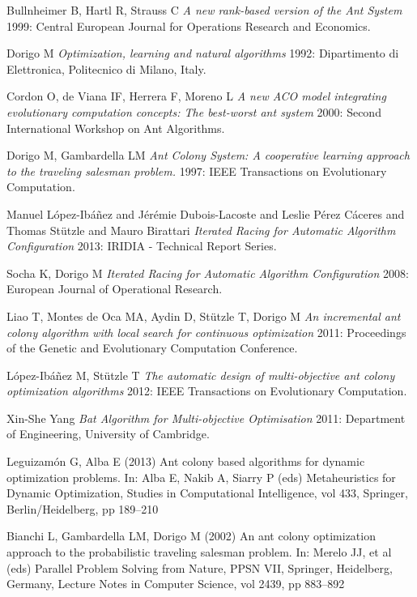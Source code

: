 \documentclass[12pt]{article}
\begin{document}
\begin{thebibliography}{1}
 Bullnheimer B, Hartl R, Strauss C {\em A new rank-based version of the
Ant System} 1999: Central European Journal for Operations Research and Economics.

 Dorigo M {\em Optimization, learning and natural algorithms} 1992: Dipartimento di Elettronica, Politecnico di Milano, Italy.

 Cordon O, de Viana IF, Herrera F, Moreno L {\em A new ACO model
integrating evolutionary computation concepts: The best-worst ant system} 2000: Second International Workshop on Ant Algorithms.

 Dorigo M, Gambardella LM {\em Ant Colony System: A cooperative learning approach to the traveling salesman problem.} 1997: IEEE Transactions on Evolutionary
Computation.

 Manuel L{\'o}pez-Ib{\'a}{\~n}ez  and  J{\'e}r{\'e}mie Dubois-Lacoste  and Leslie {P{\'e}rez C{\'a}ceres}  and  Thomas St{\"u}tzle  and  Mauro Birattari {\em Iterated Racing for Automatic Algorithm Configuration} 2013: IRIDIA - Technical Report Series.

 Socha K, Dorigo M {\em Iterated Racing for Automatic Algorithm Configuration} 2008: European Journal of Operational Research.
  
 Liao T, Montes de Oca MA, Aydin D, St{\"u}tzle T, Dorigo M {\em An incremental ant colony algorithm with local search for continuous optimization} 2011: Proceedings of the Genetic and Evolutionary
Computation Conference.  
  
 L{\'o}pez-Ib{\'a}{\~n}ez M, St{\"u}tzle T {\em The automatic design of multi-objective ant colony optimization algorithms} 2012: IEEE Transactions on Evolutionary Computation.    
  
 Xin-She Yang {\em Bat Algorithm for Multi-objective Optimisation} 2011: Department of Engineering, University of Cambridge.  

 Leguizam{\'o}n G, Alba E (2013) Ant colony based algorithms for dynamic optimization problems. In: Alba E, Nakib A, Siarry P (eds) Metaheuristics for Dynamic Optimization, Studies in Computational Intelligence, vol 433, Springer, Berlin/Heidelberg, pp 189–210
 
 Bianchi L, Gambardella LM, Dorigo M (2002) An ant colony optimization approach to the probabilistic traveling salesman problem. In: Merelo JJ, et al (eds) Parallel Problem Solving from Nature, PPSN VII, Springer, Heidelberg, Germany, Lecture Notes in Computer Science, vol 2439, pp 883–892


\end{thebibliography}
\end{document}
